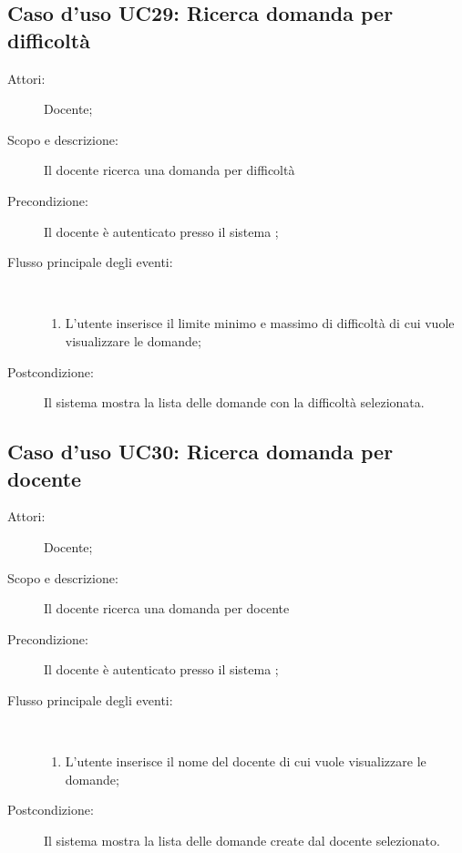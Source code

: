 \subsection{Caso d'uso UC29: Ricerca domanda per difficoltà}\begin{description}
	\item[Attori:] Docente;
	\item[Scopo e descrizione:] Il docente ricerca una domanda per difficoltà
	
	\item[Precondizione:] Il docente è autenticato presso il sistema
	;
	
	\item[Flusso principale degli eventi:] \ 
	\begin{enumerate}
		\item L'utente inserisce il limite minimo e massimo di difficoltà di cui vuole visualizzare le domande;
		
	\end{enumerate}
	\item[Postcondizione:] Il sistema mostra la lista delle domande con la difficoltà selezionata.
\end{description}
\hypertarget{UC30}{}
\subsection{Caso d'uso UC30: Ricerca domanda per docente}\begin{description}
	\item[Attori:] Docente;
	\item[Scopo e descrizione:] Il docente ricerca una domanda per docente
	\item[Precondizione:] Il docente è autenticato presso il sistema
	;
	
	\item[Flusso principale degli eventi:] \ 
	\begin{enumerate}
		\item L'utente inserisce il nome del docente di cui vuole visualizzare le domande;
		
	\end{enumerate}
	\item[Postcondizione:] Il sistema mostra la lista delle domande create dal docente selezionato.
\end{description}
\hypertarget{UC31}{}
